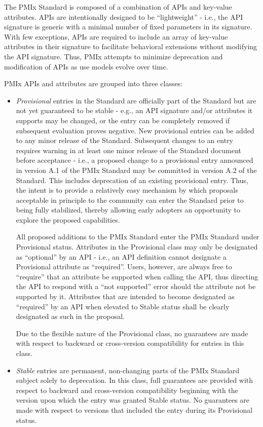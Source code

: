 \documentclass{article}
\begin{document}
The PMIx Standard is composed of a combination of APIs and key-value
attributes. APIs are intentionally designed to be ``lightweight'' -
i.e., the API signature is generic with a minimal number of fixed
parameters in its signature. With few exceptions, APIs are required to
include an array of key-value attributes in their signature to
facilitate behavioral extensions without modifying the API signature.
Thus, PMIx attempts to minimize deprecation and modification of APIs as
use models evolve over time.

PMIx APIs and attributes are grouped into three classes:

\begin{itemize}
\item
  \textit{Provisional} entries in the Standard are officially part
  of the Standard but are not yet guaranteed to be stable - e.g., an API
  signature and/or attributes it supports may be changed, or the entry
  can be completely removed if subsequent evaluation proves negative.
  New provisional entries can be added to any minor release of the
  Standard. Subsequent changes to an entry requires warning in at least
  one minor release of the Standard document before acceptance - i.e., a
  proposed change to a provisional entry announced in version A.1 of the
  PMIx Standard may be committed in version A.2 of the Standard. This
  includes deprecation of an existing provisional entry. Thus, the
  intent is to provide a relatively easy mechanism by which proposals
  acceptable in principle to the community can enter the Standard prior
  to being fully stabilized, thereby allowing early adopters an
  opportunity to explore the proposed capabilities.

  All proposed additions to the PMIx Standard enter the PMIx Standard
  under Provisional status. Attributes in the Provisional class may
  only be designated as ``optional'' by an API - i.e., an API definition
  cannot designate a Provisional attribute as ``required''. Users,
  however, are always free to ``require'' that an attribute be supported
  when calling the API, thus directing the API to respond with a ``not
  supported'' error should the attribute not be supported by it.
  Attributes that are intended to become designated as ``required'' by
  an API when elevated to Stable status shall be clearly designated
  as such in the proposal.

  Due to the flexible nature of the Provisional class, no guarantees are
  made with respect to backward or cross-version compatibility for
  entries in this class.
\item
  \textit{Stable} entries are permanent, non-changing parts of the
  PMIx Standard subject solely to deprecation. In this class, full
  guarantees are provided with respect to backward and cross-version
  compatibility beginning with the version upon which the entry was
  granted Stable status. No guarantees are made with respect to
  versions that included the entry during its Provisional status.


\end{itemize}
\end{document}
